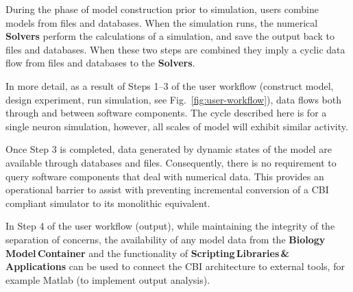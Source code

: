 \documentclass[11pt,3p,twocolumn]{JMN}
\begin{document}
During the phase of model construction prior to simulation, users combine models from files and databases.  When the simulation runs, the numerical {\bf Solvers} perform the calculations of a simulation, and save the output back to files and databases.  When these two steps are combined they imply a cyclic data flow from files and databases to the {\bf Solvers}.

In more detail, as a result of Steps 1--3 of the user workflow (construct model, design experiment, run simulation, see Fig.~\ref{fig:user-workflow}), data flows both through and between software components. The cycle described here is for a single neuron simulation, however, all scales of model will exhibit similar activity.

Once Step 3 is completed, data generated by dynamic states of the model are available through databases and files. Consequently, there is no requirement to query software components that deal with numerical data. This provides an operational barrier to assist with preventing incremental conversion of a CBI compliant simulator to its monolithic equivalent.

In Step 4 of the user workflow (output), while maintaining the integrity of the separation of concerns, the availability of any model data from the {\bf Biology\,Model\,Container} and the functionality of {\bf Scripting\,Libraries\,\&\,Applications} can be used to connect the CBI architecture to external tools, for example Matlab (to implement output analysis).
\end{document}
